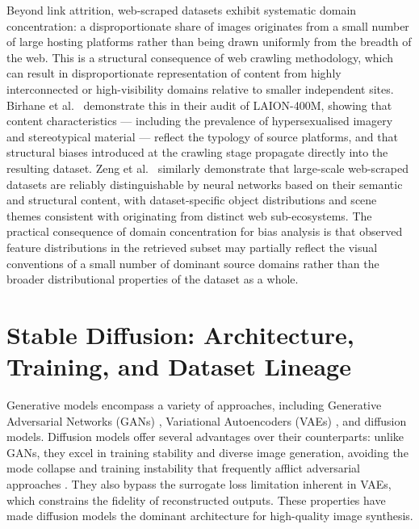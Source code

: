 Beyond link attrition, web-scraped datasets exhibit systematic domain
concentration: a disproportionate share of images originates from a small
number of large hosting platforms rather than being drawn uniformly from
the breadth of the web. This is a structural consequence of web crawling
methodology, which can result in disproportionate representation of content
from highly interconnected or high-visibility domains relative to smaller
independent sites. Birhane et al.~\cite{Birhane_2021_MultiModalDatasetsMisogynyPornography}
demonstrate this in their audit of LAION-400M, showing that content
characteristics --- including the prevalence of hypersexualised imagery and
stereotypical material --- reflect the typology of source platforms, and
that structural biases introduced at the crawling stage propagate directly
into the resulting dataset. Zeng et al.~\cite{Zeng_2024_UnderstandingBiasinLargeScaleVisualDatasets}
similarly demonstrate that large-scale web-scraped datasets are reliably
distinguishable by neural networks based on their semantic and structural
content, with dataset-specific object distributions and scene themes
consistent with originating from distinct web sub-ecosystems. The practical
consequence of domain concentration for bias analysis is that observed
feature distributions in the retrieved subset may partially reflect the
visual conventions of a small number of dominant source domains rather than
the broader distributional properties of the dataset as a whole.

\section{Stable Diffusion: Architecture, Training, and Dataset Lineage}

Generative models encompass a variety of approaches, including Generative 
Adversarial Networks (GANs) \cite{Goodfellow_2014_GAN}, Variational 
Autoencoders (VAEs) \cite{Kingma_2013_VAE}, and diffusion models. Diffusion 
models offer several advantages over their counterparts: unlike GANs, they 
excel in training stability and diverse image generation, avoiding the 
mode collapse and training instability that frequently afflict adversarial 
approaches \cite{Dhariwal_2021_DiffusionBeatGANs}. They also bypass the 
surrogate loss limitation inherent in VAEs, which constrains the fidelity 
of reconstructed outputs. These properties have made diffusion models the 
dominant architecture for high-quality image synthesis.

